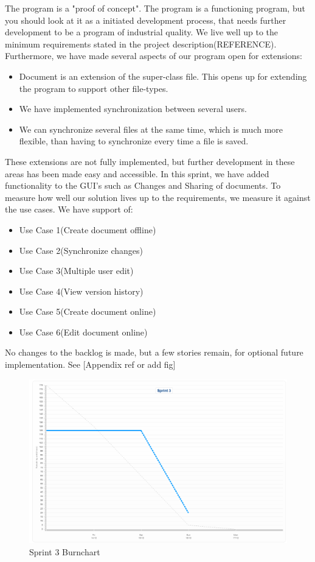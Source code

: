 The program is a "proof of concept". The program is a functioning program, but you should look at it as a initiated development process, that needs further development to be a program of industrial quality. We live well up to the minimum requirements stated in the project description(REFERENCE). Furthermore, we have made several aspects of our program open for extensions:
\begin{itemize}
\item Document is an extension of the super-class file. This opens up for extending the program to support other file-types.
\item We have implemented synchronization between several users.
\item We can synchronize several files at the same time, which is much more flexible, than having to synchronize every time a file is saved.
\end{itemize}
These extensions are not fully implemented, but further development in these areas has been made easy and accessible.
In this sprint, we have added functionality to the GUI's such as Changes and Sharing of documents. To measure how well our solution lives up to the requirements, we measure it against the use cases. We have support of:
\begin{itemize}
\item Use Case 1(Create document offline) 
\item Use Case 2(Synchronize changes) 
\item Use Case 3(Multiple user edit) 
\item Use Case 4(View version history)
\item Use Case 5(Create document online)
\item Use Case 6(Edit document online)
\end{itemize}
No changes to the backlog is made, but a few stories remain, for optional future implementation. See [Appendix ref or add fig]
\begin{figure}[H]
  \includegraphics[width=\textwidth]{illustrations/sprint3burn.PNG}
  \caption{Sprint 3 Burnchart}
  \label{sprint3burnchart}
\end{figure}
